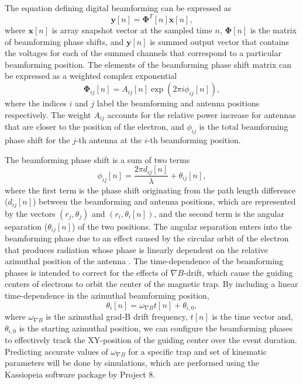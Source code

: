 The equation defining digital beamforming can be expressed as
\begin{equation}
    \mathbf{y}[n] = \mathbf{\Phi}^T[n]\mathbf{x}[n],
    \label{eq:beamforming}
\end{equation}
where $\mathbf{x}[n]$ is array snapshot vector at the sampled time $n$, $\mathbf{\Phi}[n]$ is the matrix of beamforming phase shifts, and $\mathbf{y}[n]$ is summed output vector that contains the voltages for each of the summed channels that correspond to a particular beamforming position. %
The elements of the beamforming phase shift matrix can be expressed as a weighted complex exponential
\begin{equation}
    \mathbf{\Phi}_{ij}[n]=A_{ij}[n]\exp{\left(2\pi i\phi_{ij}[n]\right)},
\end{equation}
where the indices $i$ and $j$ label the beamforming and antenna positions respectively. The weight $A_{ij}$ accounts for the relative power increase for antennas that are closer to the position of the electron, and $\phi_{ij}$ is the total beamforming phase shift for the $j$-th antenna at the $i$-th beamforming position.

The beamforming phase shift is a sum of two terms
\begin{equation}
    \phi_{ij}[n]=\frac{2\pi d_{ij}[n]}{\lambda}+\theta_{ij}[n],
\end{equation}
where the first term is the phase shift originating from the path length difference ($d_{ij}[n]$) between the beamforming and antenna positions, which are represented by the vectors $(r_j,\theta_j)$ and $(r_i,\theta_i[n])$, and the second term is the angular separation ($\theta_{ij}[n]$) of the two positions. The angular separation enters into the beamforming phase due to an effect caused by the circular orbit of the electron that produces radiation whose phase is linearly dependent on the relative azimuthal position of the antenna \cite{nb_thesis, p8synca}. The time-dependence of the beamforming phases is intended to correct for the effects of $\nabla B$-drift, which cause the guiding centers of electrons to orbit the center of the magnetic trap. By including a linear time-dependence in the azimuthal beamforming position,
\begin{equation}
    \theta_{i}[n]=\omega_{\nabla B}t[n]+\theta_{i,0},
\end{equation}
where $\omega_{\nabla B}$ is the azimuthal grad-B drift frequency, $t[n]$ is the time vector and, $\theta_{i,0}$ is the starting azimuthal position, we can configure the beamforming phases to effectively track the XY-position of the guiding center over the event duration. Predicting accurate values of $\omega_{\nabla B}$ for a specific trap and set of kinematic parameters will be done by simulations, which are performed using the Kassiopeia software package \cite{kassiopeia} by Project 8.

